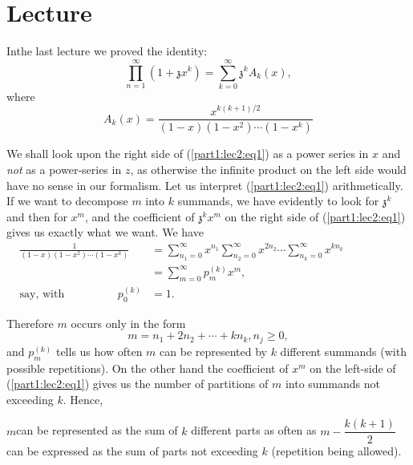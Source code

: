 \chapter{Lecture}\label{part1:lec2}

In\pageoriginale  the last lecture we proved the identity:
\begin{equation*}
  \prod\limits_{n=1}^\infty (1+ \mathfrak{z} x^k) =
  \sum\limits_{k=0}^\infty \mathfrak{z}^k A_k (x), \tag{1}\label{part1:lec2:eq1}
\end{equation*}
where
\begin{equation*}
A_k (x) = \frac{x^{k(k+1)/2}}{(1-x)(1-x^2)\cdots
    (1-x^k)}\tag{2}\label{part1:lec2:eq2}
\end{equation*}

We shall look upon the right side of (\ref{part1:lec2:eq1}) as a power series in $x$ and
\textit{not} as a power-series in $z$, as otherwise the infinite
product on the left side would have no sense in our formalism. Let us
interpret (\ref{part1:lec2:eq1}) arithmetically. If we want to decompose $m$ into $k$
summands, we have evidently to look for $\mathfrak{z}^k$ and then for
$x^m$, and the coefficient of $\mathfrak{z}^k x^m$ on the right side
of (\ref{part1:lec2:eq1}) gives us exactly what we want. We have
\begin{align*}
  \frac{1}{(1-x)(1-x^2)\cdots (1-x^k)} & = \sum_{n_1=0}^\infty
  x^{n_1} \sum_{n_2=0}^\infty x^{2n_2}\cdots
  \sum_{n_k=0}^\infty x^{kn_k}\hspace{2cm}\\
  & = \sum_{m=0}^\infty p_m^{(k)} x^m,\\
  \text{say, with} \hspace{2cm}  p_0^{(k)} & =1.
\end{align*}

Therefore $m$ occurs only in the form
$$
m=n_1 + 2n_2 + \cdots + kn_k, n_j \geq 0,
$$
and $p_m^{(k)}$ tells us how often $m$ can be represented by $k$
different summands (with possible repetitions). On the other hand the
coefficient of $x^m$ on the left-side of (\ref{part1:lec2:eq1}) gives us the number of
partitions of $m$ into summands not exceeding $k$. Hence,
\begin{thm}\label{part1:lec2:thm2} %
  $m$\pageoriginale  can be represented as the sum of $k$ different parts as often as
  $m-\dfrac{k(k+1)}{2}$ can be expressed as the sum of parts not
  exceeding $k$ (repetition being allowed). 
\end{thm}

